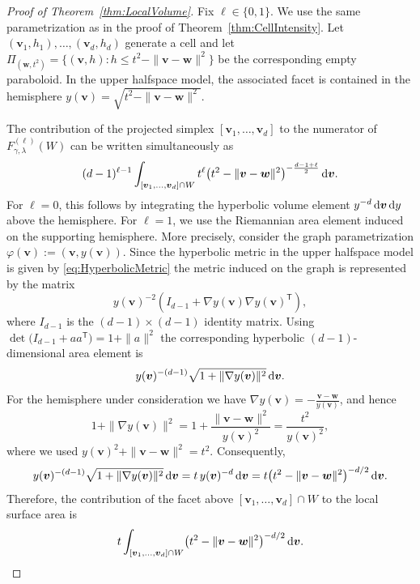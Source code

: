 \documentclass[11pt,a4paper]{article}
\theoremstyle{plain}
\theoremstyle{definition}
\theoremstyle{remark}
\newcommand{\dint}{\textup{d}}
\newcommand{\bv}{\boldsymbol{v}}
\newcommand{\bw}{\boldsymbol{w}}
\begin{document}
\begin{proof}[Proof of Theorem~\ref{thm:LocalVolume}]
	Fix $\ell\in\{0,1\}$. We use the same parametrization as in the proof
	of Theorem~\ref{thm:CellIntensity}. Let
	$(\bv_1,h_1),\ldots,(\bv_d,h_d)$ generate a cell and let $\Pi_{(\bw,t^2)}=\{(\bv,h):h\le t^2-\|\bv-\bw\|^2\}$ be the corresponding empty paraboloid. In the upper halfspace model, the
	associated facet is contained in the hemisphere $y(\bv)=\sqrt{t^2-\|\bv-\bw\|^2}$.

	The contribution of the projected simplex
	$[\bv_1,\ldots,\bv_d]$ to the numerator of
	$F_{\gamma,\lambda}^{(\ell)}(W)$ can be written simultaneously as
	\[
		(d-1)^{\ell-1}
		\int_{[\bv_1,\ldots,\bv_d]\cap W}
		t^\ell
		\bigl(t^2-\|\bv-\bw\|^2\bigr)^{-\frac{d-1+\ell}{2}}
		\,\dint\bv.
	\]
	For $\ell=0$, this follows by integrating the hyperbolic volume element
	$y^{-d}\,\dint\bv\,\dint y$ above the hemisphere. For $\ell=1$, we use the Riemannian area element induced on the
	supporting hemisphere. More precisely, consider the graph parametrization $\varphi(\bv):=(\bv,y(\bv))$.
	Since the hyperbolic metric in the upper halfspace model is given by \eqref{eq:HyperbolicMetric}
	the metric induced on the graph is represented by the matrix
	\[
		y(\bv)^{-2}
		\left(
		I_{d-1}+\nabla y(\bv)\nabla y(\bv)^{\mathsf T}
		\right),
	\]
	where $I_{d-1}$ is the $(d-1)\times(d-1)$ identity matrix.
	Using $\det\bigl(I_{d-1}+aa^{\mathsf T}\bigr)=1+\|a\|^2$
	the corresponding hyperbolic $(d-1)$-dimensional area element is
	\[
		y(\bv)^{-(d-1)}
		\sqrt{1+\|\nabla y(\bv)\|^2}\,\dint\bv.
	\]
	For the hemisphere under consideration we have $\nabla y(\bv)=-\frac{\bv-\bw}{y(\bv)}$, and hence
	\[
		1+\|\nabla y(\bv)\|^2
		=
		1+\frac{\|\bv-\bw\|^2}{y(\bv)^2}
		=
		\frac{t^2}{y(\bv)^2},
	\]
	where we used
	$y(\bv)^2+\|\bv-\bw\|^2=t^2$. Consequently,
	\[
		y(\bv)^{-(d-1)}
		\sqrt{1+\|\nabla y(\bv)\|^2}\,\dint\bv
		=
		t\,y(\bv)^{-d}\,\dint\bv
		=
		t\bigl(t^2-\|\bv-\bw\|^2\bigr)^{-d/2}\,\dint\bv.
	\]
	Therefore, the contribution of the facet above
	$[\bv_1,\ldots,\bv_d]\cap W$ to the local surface area is
	\[
		t\int_{[\bv_1,\ldots,\bv_d]\cap W}
		\bigl(t^2-\|\bv-\bw\|^2\bigr)^{-d/2}\,\dint\bv.
	\]


\end{proof}
\end{document}
